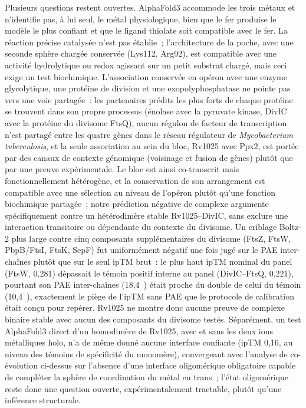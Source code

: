 \documentclass[11pt,a4paper]{article}
\newcommand{\mtb}{\textit{Mycobacterium tuberculosis}}
\newcommand{\ang}{\text{\AA}}
\begin{document}
Plusieurs questions restent ouvertes. AlphaFold3 accommode les trois métaux et n'identifie pas, à lui seul, le métal physiologique, bien que le fer produise le modèle le plus confiant et que le ligand thiolate soit compatible avec le fer. La réaction précise catalysée n'est pas établie~; l'architecture de la poche, avec une seconde sphère chargée conservée (Lys112, Arg92), est compatible avec une activité hydrolytique ou redox agissant sur un petit substrat chargé, mais ceci exige un test biochimique. L'association conservée en opéron avec une enzyme glycolytique, une protéine de division et une exopolyphosphatase ne pointe pas vers une voie partagée~: les partenaires prédits les plus forts de chaque protéine se trouvent dans son propre processus (énolase avec la pyruvate kinase, DivIC avec la protéine du divisome FtsQ), aucun régulon de facteur de transcription n'est partagé entre les quatre gènes dans le réseau régulateur de \mtb{}, et la seule association au sein du bloc, Rv1025 avec Ppx2, est portée par des canaux de contexte génomique (voisinage et fusion de gènes) plutôt que par une preuve expérimentale. Le bloc est ainsi co-transcrit mais fonctionnellement hétérogène, et la conservation de son arrangement est compatible avec une sélection au niveau de l'opéron plutôt qu'une fonction biochimique partagée~; notre prédiction négative de complexe argumente spécifiquement contre un hétérodimère stable Rv1025--DivIC, sans exclure une interaction transitoire ou dépendante du contexte du divisome. Un criblage Boltz-2 plus large contre cinq composants supplémentaires du divisome (FtsZ, FtsW, PbpB/FtsI, FtsK, SepF) fut uniformément négatif une fois jugé sur le PAE inter-chaînes plutôt que sur le seul ipTM brut~: le plus haut ipTM nominal du panel (FtsW, 0,281) dépassait le témoin positif interne au panel (DivIC--FtsQ, 0,221), pourtant son PAE inter-chaînes (18,4~\ang{}) était proche du double de celui du témoin (10,4~\ang{}), exactement le piège de l'ipTM sans PAE que le protocole de calibration était conçu pour repérer. Rv1025 ne montre donc aucune preuve de complexe binaire stable avec aucun des composants du divisome testés. Séparément, un test AlphaFold3 direct d'un homodimère de Rv1025, avec et sans les deux ions métalliques holo, n'a de même donné aucune interface confiante (ipTM 0,16, au niveau des témoins de spécificité du monomère), convergeant avec l'analyse de co-évolution ci-dessus sur l'absence d'une interface oligomérique obligatoire capable de compléter la sphère de coordination du métal en trans~; l'état oligomérique reste donc une question ouverte, expérimentalement tractable, plutôt qu'une inférence structurale.
\end{document}
